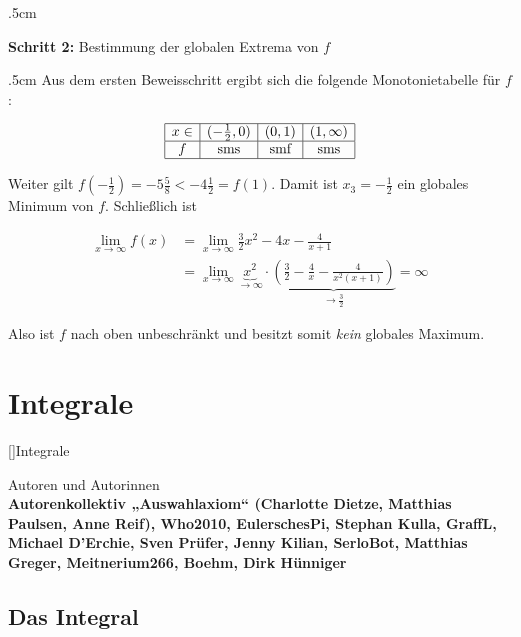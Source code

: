 \documentclass[fontsize=9pt,
               parskip=half-,
               DIV=14,
               listof=chapterentry,
               tocflat]{scrbook}
\newenvironment{indentblock}{\begin{adjustwidth}{.5cm}{}}{\end{adjustwidth}}
\newenvironment{authors}{\par\vspace*{\fill}\color{white}Autoren und
Autorinnen\\\bfseries}{\clearpage}
\newcommand{\proofstep}[1]{\textbf{\textcolor{sblau}{#1}}}
\begin{document}
\begin{solution*}
\begin{indentblock}
\end{indentblock}

\proofstep{Schritt 2:}
 Bestimmung der globalen Extrema von $f$\begin{indentblock}
Aus dem ersten Beweisschritt ergibt sich die folgende Monotonietabelle für $f$:

\begin{align*}
{\begin{array}{|c|c|c|c|}\hline x\in &(-{\tfrac {1}{2}},0)&(0,1)&(1,\infty )\\\hline f&{\text{sms}}&{\text{smf}}&{\text{sms}}\\\hline \end{array}}
\end{align*}

Weiter gilt $f(-{\tfrac {1}{2}})=-5{\tfrac {5}{8}}<-4{\tfrac {1}{2}}=f(1)$. Damit ist $x_{3}=-{\tfrac {1}{2}}$ ein globales Minimum von $f$. Schließlich ist

\begin{align*}
\lim _{x\to \infty }f(x)&=\lim _{x\to \infty }{\tfrac {3}{2}}x^{2}-4x-{\tfrac {4}{x+1}}\\[0.3em]&=\lim _{x\to \infty }\underbrace {x^{2}} _{\to \infty }\cdot \underbrace {\left({\tfrac {3}{2}}-{\tfrac {4}{x}}-{\tfrac {4}{x^{2}(x+1)}}\right)} _{\to {\tfrac {3}{2}}}=\infty 
\end{align*}

Also ist $f$ nach oben unbeschränkt und besitzt somit \emph{kein} globales Maximum.

\end{indentblock}

\end{solution*}

\part{Integrale}

[]{Integrale}\begin{authors}
Autorenkollektiv „Auswahlaxiom“ (Charlotte Dietze, Matthias Paulsen, Anne Reif), Who2010, EulerschesPi, Stephan Kulla, GraffL, Michael D'Erchie, Sven Prüfer, Jenny Kilian, SerloBot, Matthias Greger, Meitnerium266, Boehm, Dirk Hünniger\end{authors}

\chapter{Das Integral}
\end{document}
